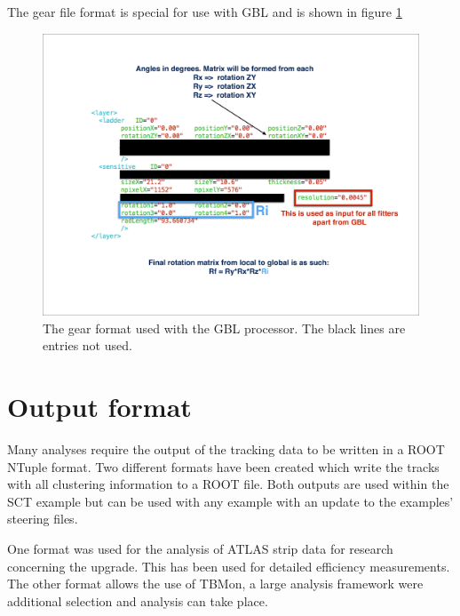 The gear file format is special for use with GBL and is shown in figure \ref{fig:gear} 

\begin{figure}[H]
\centering
\includegraphics[width=1.0\linewidth]{figures/gear-format.pdf}
\caption{The gear format used with the GBL processor. The black lines are entries not used.}
\label{fig:gear}
\end{figure}

\section{Output format}
Many analyses require the output of the tracking data to be written in a ROOT NTuple format. Two different formats have been created which write the tracks with all clustering information to a ROOT file. Both outputs are used within the SCT example but can be used with any example with an update to the examples' steering files. 

One format was used for the analysis of ATLAS strip data for research concerning the upgrade. This has been used for detailed efficiency measurements. The other format allows the use of TBMon, a large analysis framework were additional selection and analysis can take place.



